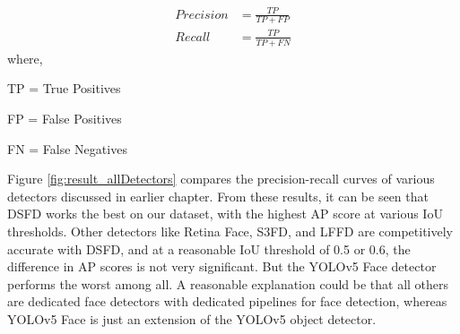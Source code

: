 \begin{equation}
\begin{split}
Precision & = \frac{TP}{TP + FP} \\
Recall & = \frac{TP}{TP + FN}
\end{split}
\end{equation}
where,

\quad TP = True Positives

\quad FP = False Positives

\quad FN = False Negatives

Figure \ref{fig:result_allDetectors} compares the precision-recall curves of various detectors discussed in earlier chapter. From these results, it can be seen that DSFD works the best on our dataset, with the highest AP score at various IoU thresholds. Other detectors like Retina Face, S3FD, and LFFD are competitively accurate with DSFD, and at a reasonable IoU threshold of 0.5 or 0.6, the difference in AP scores is not very significant. But the YOLOv5 Face detector performs the worst among all. A reasonable explanation could be that all others are dedicated face detectors with dedicated pipelines for face detection, whereas YOLOv5 Face is just an extension of the YOLOv5 object detector.

